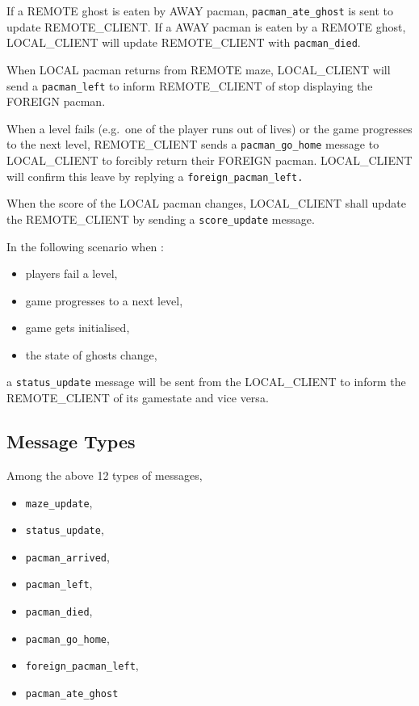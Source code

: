 \documentclass[]{article}
\providecommand{\tightlist}{%
  \setlength{\itemsep}{0pt}\setlength{\parskip}{0pt}}
\begin{document}
If a REMOTE ghost is eaten by AWAY pacman, \texttt{pacman\_ate\_ghost}
is sent to update REMOTE\_CLIENT. If a AWAY pacman is eaten by a REMOTE
ghost, LOCAL\_CLIENT will update REMOTE\_CLIENT with
\texttt{pacman\_died}.

When LOCAL pacman returns from REMOTE maze, LOCAL\_CLIENT will send a
\texttt{pacman\_left} to inform REMOTE\_CLIENT of stop displaying the
FOREIGN pacman.

When a level fails (e.g.~one of the player runs out of lives) or the
game progresses to the next level, REMOTE\_CLIENT sends a
\texttt{pacman\_go\_home} message to LOCAL\_CLIENT to forcibly return
their FOREIGN pacman. LOCAL\_CLIENT will confirm this leave by replying
a \texttt{foreign\_pacman\_left.}

When the score of the LOCAL pacman changes, LOCAL\_CLIENT shall update
the REMOTE\_CLIENT by sending a \texttt{score\_update} message.

In the following scenario when :

\begin{itemize}
\tightlist
\item
  players fail a level,
\item
  game progresses to a next level,
\item
  game gets initialised,
\item
  the state of ghosts change,
\end{itemize}

a \texttt{status\_update} message will be sent from the LOCAL\_CLIENT to
inform the REMOTE\_CLIENT of its gamestate and vice versa.

\hypertarget{message-types}{%
\subsection{Message Types}\label{message-types}}

Among the above 12 types of messages,

\begin{itemize}
\tightlist
\item
  \texttt{maze\_update},
\item
  \texttt{status\_update},
\item
  \texttt{pacman\_arrived},
\item
  \texttt{pacman\_left},
\item
  \texttt{pacman\_died},
\item
  \texttt{pacman\_go\_home},
\item
  \texttt{foreign\_pacman\_left},
\item
  \texttt{pacman\_ate\_ghost}
\end{itemize}
\end{document}
